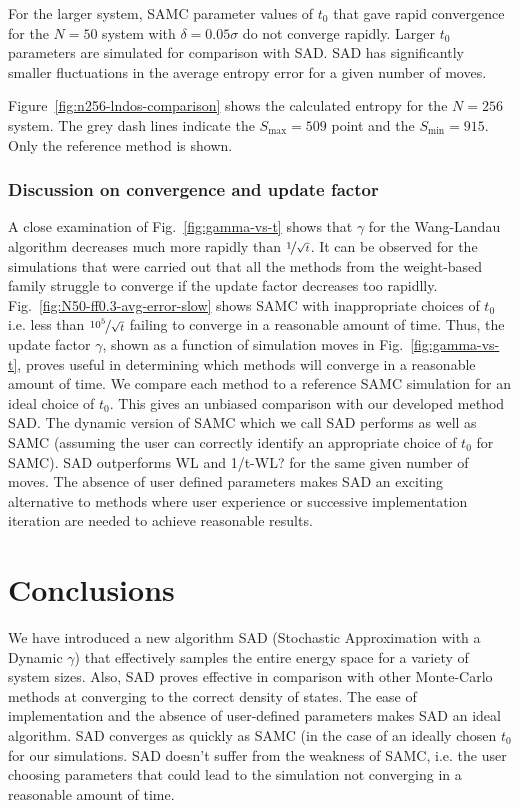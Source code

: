\documentclass[letterpaper,twocolumn,amsmath,amssymb,pre,aps,10pt]{revtex4-1}
\begin{document}
For the larger system, SAMC parameter values of $t_0$ that gave rapid
convergence for the $N = 50$ system with $\delta = 0.05\sigma$ do not
converge rapidly.  Larger $t_0$ parameters are simulated for
comparison with SAD.  SAD has significantly smaller fluctuations
in the average entropy error for a given number of moves.

{\color{red}
Figure~\ref{fig:n256-lndos-comparison} shows the calculated entropy for
the $N = 256$ system. The grey dash lines indicate the $S_{\max} = 509$
point and the $S_{\min} = 915$. Only the reference method is shown.
}

\subsubsection{Discussion on convergence and update factor}

A close examination of Fig.~\ref{fig:gamma-vs-t} shows that $\gamma$
for the Wang-Landau algorithm decreases much more rapidly than
$\nicefrac{1}{\sqrt{t}}$. It can be observed  for the simulations that
were carried out that all the methods from the weight-based family
struggle to converge if the update factor decreases too rapidlly.
Fig.~\ref{fig:N50-ff0.3-avg-error-slow} shows SAMC with inappropriate choices
of $t_0$ i.e. less than $\nicefrac{10^5}{\sqrt{t}}$ failing to converge
in a reasonable amount of time. Thus, the update factor $\gamma$, shown
as a function of simulation moves in Fig.~\ref{fig:gamma-vs-t}, proves
useful in determining which methods will converge in a reasonable
amount of time. We compare each method to a reference SAMC
simulation for an ideal choice of $t_0$.  This gives an unbiased
comparison with our developed method SAD. The dynamic version of SAMC
which we call SAD performs as well as SAMC (assuming the user can
correctly identify an appropriate choice of $t_0$ for SAMC).  SAD
outperforms WL and 1/t-WL? for the same given number of moves. The
absence of user defined parameters makes SAD an exciting alternative to
methods where user experience or successive implementation iteration
are needed to achieve reasonable results.

\section{Conclusions}

We have introduced a new algorithm SAD (Stochastic Approximation with a
Dynamic $\gamma$) that effectively samples the entire energy space for
a variety of system sizes.  Also, SAD proves effective in comparison
with other Monte-Carlo methods at converging to the correct density of
states.  The ease of implementation and the absence of user-defined
parameters makes SAD an ideal algorithm. SAD converges as quickly as
SAMC (in the case of an ideally chosen $t_0$ for our simulations. SAD
doesn't suffer from the weakness of SAMC, i.e. the user choosing
parameters that could lead to the simulation not converging in a
reasonable amount of time.
\end{document}
